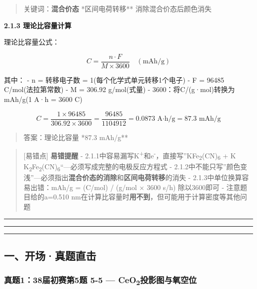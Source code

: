 \begin{quote}
关键词：\textbf{混合价态} \箭 **区间电荷转移** \箭 消除混合价态后颜色消失
\end{quote}

\textbf{2.1.3 理论比容量计算}

理论比容量公式：

\[C = \frac{n \cdot F}{M \times 3600} \quad (\text{mAh/g})\]

其中：
- n = 转移电子数 = 1(每个化学式单元转移1个电子)
- F = 96485 C/mol(法拉第常数)
- M = 306.92 g/mol(式量)
- 3600：将C/(g·mol)转换为mAh/g(1 A·h = 3600 C)

\[C = \frac{1 \times 96485}{306.92 \times 3600} = \frac{96485}{1104912} = 0.0873 \text{ A·h/g} = 87.3 \text{ mAh/g}\]

\begin{quote}
答案：理论比容量 *87.3 mAh/g**
\end{quote}

\begin{quote}
{[}易错点{]} \textbf{易错提醒}
- 2.1.1中容易漏写K\textsuperscript{+}和e\textsuperscript{-}，直接写''KFe\textsubscript{2}(CN)\textsubscript{6} + K \箭 K\textsubscript{2}Fe\textsubscript{2}(CN)\textsubscript{6}``---必须写成完整的电极反应方程式
- 2.1.2中不能只写''颜色变浅''---必须指出\textbf{混合价态的消除}和\textbf{区间电荷转移}的消失
- 2.1.3中单位换算容易出错：mAh/g = (C/mol) / (g/mol × 3600 s/h) \箭 除以3600即可
- 注意题目给的a=0.510 nm在计算比容量时\textbf{用不到}，但可能用于计算密度等其他问题
\end{quote}

\begin{center}\rule{0.5\linewidth}{0.5pt}\end{center}

\begin{center}\rule{0.5\linewidth}{0.5pt}\end{center}

\begin{center}\rule{0.5\linewidth}{0.5pt}\end{center}

\subsection{一、开场·真题直击}\label{ux4e00ux5f00ux573aux771fux9898ux76f4ux51fb-3}

\subsubsection{\texorpdfstring{真题1：38届初赛第5题 5-5 --- CeO\textsubscript{2}投影图与氧空位}{真题1：38届初赛第5题 5-5 --- CeO2投影图与氧空位}}\label{ux771fux9898138ux5c4aux521dux8d5bux7b2c5ux9898-5-5-ceo2ux6295ux5f71ux56feux4e0eux6c27ux7a7aux4f4d}

